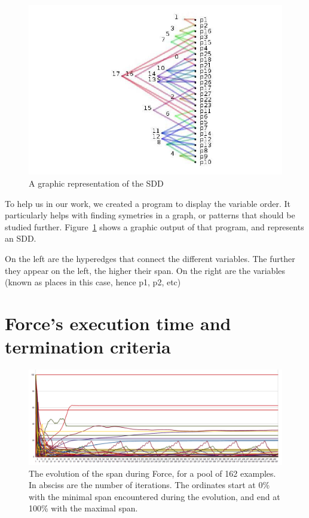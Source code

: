 \documentclass[12pt]{report}
\begin{document}
\begin{figure}[!h]
  \centering
  \includegraphics[scale=0.5]{images/representation_order.jpg}
  \caption{A graphic representation of the SDD}
  \label{order_graph}
\end{figure}

To help us in our work, we created a program to display the variable order. It particularly helps with finding symetries in a graph, or patterns that should be studied further. Figure~\ref{order_graph} shows a graphic output of that program, and represents an SDD.

On the left are the hyperedges that connect the different variables. The further they appear on the left, the higher their span. On the right are the variables (known as places in this case, hence p1, p2, etc)

\section{Force's execution time and termination criteria}

\begin{figure}[H]
  \begin{center}
  \includegraphics[width=1\textwidth]{images/force_plot.png}
  \end{center}
  \caption{The evolution of the span during Force, for a pool of 162 examples. In absciss are the number of iterations. The ordinates start at 0\% with the minimal span encountered during the evolution, and end at 100\% with the maximal span.}
  \label{force_plot}
\end{figure}
\end{document}
